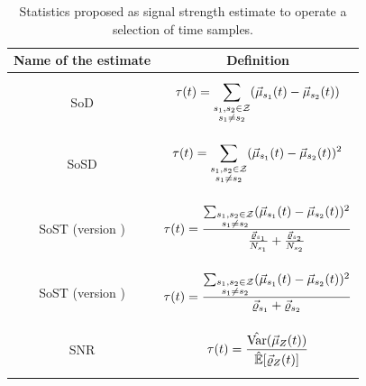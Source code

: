 \begin{table}[]
\centering
\caption{Statistics proposed as signal strength estimate to operate a selection of time samples.}
\label{table:PoIselectors}
\begin{tabular}{|c|c|}
\toprule
Name of the estimate    &  Definition\\
\midrule
SoD& \parbox{6cm}{\begin{equation*} \sPOI(t) = \sum_{\substack{\sensVarValue{1}, \sensVarValue{2} \in \sensVarSet \\ \sensVarValue{1} \neq \sensVarValue{2}}} (\mmmXclass[\sensVarValue{1}](t) - \mmmXclass[\sensVarValue{2}](t)) \end{equation*}} \\
\hline
SoSD & \parbox{6cm}{\begin{equation*} \sPOI(t) = \sum_{\substack{\sensVarValue{1}, \sensVarValue{2} \in \sensVarSet \\ \sensVarValue{1} \neq \sensVarValue{2}}} (\mmmXclass[\sensVarValue{1}](t) - \mmmXclass[\sensVarValue{2}](t))^2 \end{equation*}} \\
\hline
SoST (version \cite{gierlichs2006templates}) & \parbox{6cm}{\begin{equation*} \sPOI(t) = \frac{\sum_{\substack{\sensVarValue{1}, \sensVarValue{2} \in \sensVarSet \\ \sensVarValue{1} \neq \sensVarValue{2}}} (\mmmXclass[\sensVarValue{1}](t) - \mmmXclass[\sensVarValue{2}](t))^2}{\frac{\varXclass[\sensVarValue{1}]}{\nbTracesPerClass[\sensVarValue{1}]}+\frac{\varXclass[\sensVarValue{2}]}{\nbTracesPerClass[\sensVarValue{2}]}}  \end{equation*}}\\
\hline
SoST (version \cite{bar2010improved}) & \parbox{6cm}{\begin{equation*} \sPOI(t) = \frac{\sum_{\substack{\sensVarValue{1}, \sensVarValue{2} \in \sensVarSet \\ \sensVarValue{1} \neq \sensVarValue{2}}} (\mmmXclass[\sensVarValue{1}](t) - \mmmXclass[\sensVarValue{2}](t))^2}{\varXclass[\sensVarValue{1}]+\varXclass[\sensVarValue{2}]}  \end{equation*}}\\
\hline
SNR & \parbox{6cm}{\begin{equation} \sPOI(t) = \frac{\varEst(\mmmXclass[Z](t))}{\esperEst[\varXclass[Z](t)]}  \end{equation}\label{eq:SNR_formula}}\\
\hline
\end{tabular}

\end{table}

